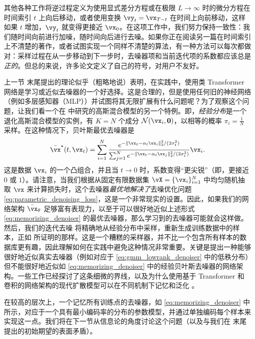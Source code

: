 \documentclass[../../book-main_zh.tex]{subfiles}
\begin{document}
\begin{remark}
	其他各种工作将逆过程定义为使用显式差分方程或在极限 \(L \to \infty\) 时的微分方程在时间索引 \(t\) 上向后移动，或者使用变换 \(\vy_{t} = \vx_{T - t}\) 在时间上向前移动，这样如果 \(t\) 增加，\(\vy_{t}\) 就变得更接近 \(\vx_{0}\)。在这项工作中，我们努力保持一致性：我们随时间向前进行加噪，随时间向后进行去噪。如果你正在阅读另一篇在时间索引上不清楚的著作，或者试图实现一个同样不清楚的算法，有一种方法可以每次都做对：采样过程在从一步移动到下一步时，去噪器项和当前迭代项的系数都应该总是\textit{正的}。但总的来说，许多论文定义了自己的符号，对用户不友好。
\end{remark}

\begin{remark}
	上一节  末尾提出的理论似乎（粗略地说）表明，在实践中，使用类 Transformer 网络是学习或近似去噪器的一个好选择。这是合理的，但是使用任何旧的神经网络（例如多层感知器（MLP））并试图将其无限扩展有什么问题呢？为了观察这个问题，让我们看一个在  中研究的高斯混合模型的另一个特例。即，\textit{经验分布}是一个退化高斯混合模型的实例，有 \(K = N\) 个成分 \(\dNorm(\vx_{i}, \vzero)\)，以相等的概率 \(\pi_{i} = \frac{1}{N}\) 采样。在这种情况下，贝叶斯最优去噪器是
	\begin{equation}\label{eq:memorizing_denoiser}
		\bar{\vx}^{\star}(t, \vx_{t}) = \sum_{i = 1}^{N}\frac{e^{-\|\vx_{t} - \alpha_{t}\vx_{i}\|_{2}^{2}/(2\sigma_{t}^{2})}}{\sum_{j = 1}^{N}e^{-\|\vx_{t} - \alpha_{t}\vx_{j}\|_{2}^{2}/(2\sigma_{t}^{2})}}\vx_{i}.
	\end{equation}
	这是数据 \(\vx_{i}\) 的一个凸组合，并且当 \(t \to 0\) 时，系数变得“更尖锐”（即，更接近 \(0\) 或 \(1\)）。请注意，当我们根据从固定有限数据集 \(\vX = \{\vx_{i}\}_{i = 1}^{N}\) 中均匀随机抽取 \(\vx\) 来计算损失时，这个去噪器\textit{最优地解决了}去噪优化问题 \eqref{eq:parametric_denoising_loss}，这是一个非常现实的设置。因此，如果我们的网络架构 \(\bar{\vx}_{\theta}\) 足够富有表现力，以至于可以很好地近似上述形式 \eqref{eq:memorizing_denoiser} 的最优去噪器，那么学习到的去噪器可能就会这样做。然后，我们的迭代去噪  将精确地从经验分布中采样，重新生成训练数据中的样本，正如  所证明的那样。这是一个糟糕的采样器，并不比一个包含所有样本的数据库更有趣，因此理解如何在实践中避免这种情况非常重要。关键是提出一种能够很好地近似真实去噪器（例如对应于 \eqref{eq:gmm_lowrank_denoiser} 中的低秩分布）但不能很好地近似如 \eqref{eq:memorizing_denoiser} 中的经验贝叶斯去噪器的网络架构。一些工作已经探讨了这条细微的界线，以及为什么使用基于 Transformer 和卷积的网络架构的现代扩散模型可以在不同机制下记忆和泛化 \citep{kamb2024analytic,niedoba2024towards}。

	在较高的层次上，一个记忆所有训练点的去噪器，如 \eqref{eq:memorizing_denoiser} 中所示，对应于一个具有最小编码率的分布的参数模型，并通过单独编码每个样本来实现这一点。我们将在下一节从信息论的角度讨论这个问题（以及与我们在  末尾提出的初始期望的表面矛盾）。
\end{remark}
\end{document}
